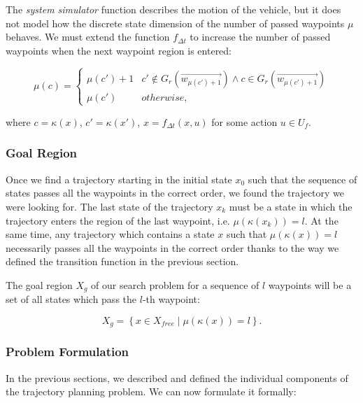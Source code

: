 The \textit{system simulator} function describes the motion of the vehicle, but it does not model how the discrete state dimension of the number of passed waypoints $\mu$ behaves. We must extend the function $f_{\Delta t}$ to increase the number of passed waypoints when the next waypoint region is entered:

\begin{equation*}
\mu(c)=
\begin{cases}
\mu(c')+1 & c' \not\in G_r(\vec{w_{\mu(c')+1}}) \wedge c\in G_r(\vec{w_{\mu(c')+1}}) \\
\mu(c') & otherwise,
\end{cases}
\end{equation*}

where $c=\kappa(x)$, $c'=\kappa(x')$, $x=f_{\Delta t}(x, u)$ for some action $u\in U_f$.


\subsubsection{Goal Region}

Once we find a trajectory starting in the initial state $x_0$ such that the sequence of states passes all the waypoints in the correct order, we found the trajectory we were looking for. The last state of the trajectory $x_k$ must be a state in which the trajectory enters the region of the last waypoint, i.e. $\mu(\kappa(x_k)) = l$. At the same time, any trajectory which contains a state $x$ such that $\mu(\kappa(x)) = l$ necessarily passes all the waypoints in the correct order thanks to the way we defined the transition function in the previous section.

The goal region $X_g$ of our search problem for a sequence of $l$ waypoints will be a set of all states which pass the $l$-th waypoint:

\[
	X_g=\left\{x\in X_{free} \mid \mu(\kappa(x))=l\right\}.
\]

\subsubsection{Problem Formulation}

In the previous sections, we described and defined the individual components of the trajectory planning problem. We can now formulate it formally:

